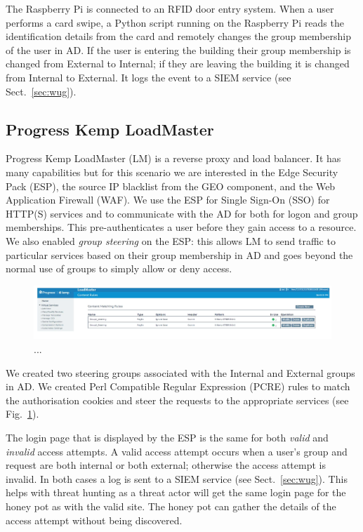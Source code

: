 The Raspberry Pi is connected to an RFID door entry system.  When a
user performs a card swipe, a Python script running on the Raspberry
Pi reads the identification details from the card and remotely changes
the group membership of the user in AD.  If the user is entering the
building their group membership is changed from External to Internal;
if they are leaving the building it is changed from Internal to
External.  It logs the event to a SIEM service (see
Sect.~\ref{sec:wug}).

\subsection{Progress Kemp LoadMaster}

Progress Kemp LoadMaster (LM) is a reverse proxy and load balancer.
It has many capabilities but for this scenario we are interested in
the Edge Security Pack (ESP), the source IP blacklist from the GEO
component, and the Web Application Firewall (WAF).  We use the ESP for
Single Sign-On (SSO) for HTTP(S) services and to communicate with the
AD for both for logon and group memberships.  This pre-authenticates a
user before they gain access to a resource.  We also enabled
\textit{group steering} on the ESP: this allows LM to send traffic to
particular services based on their group membership in AD and goes
beyond the normal use of groups to simply allow or deny access.

\begin{figure}
  \centerline{\includegraphics[width=\textwidth]{img/loadmaster-pcre-rules}}
  \caption{...}\label{fig:loadmaster-pcre-rules}
\end{figure}

We created two steering groups associated with the Internal and
External groups in AD.  We created Perl Compatible Regular Expression
(PCRE) rules to match the authorisation cookies and steer the requests
to the appropriate services (see
Fig.~\ref{fig:loadmaster-pcre-rules}).

The login page that is displayed by the ESP is the same for both
\textit{valid} and \textit{invalid} access attempts.  A valid access
attempt occurs when a user's group and request are both internal or
both external; otherwise the access attempt is invalid.  In both cases
a log is sent to a SIEM service (see Sect.~\ref{sec:wug}).  This helps
with threat hunting as a threat actor will get the same login page for
the honey pot as with the valid site.  The honey pot can gather the
details of the access attempt without being discovered.

